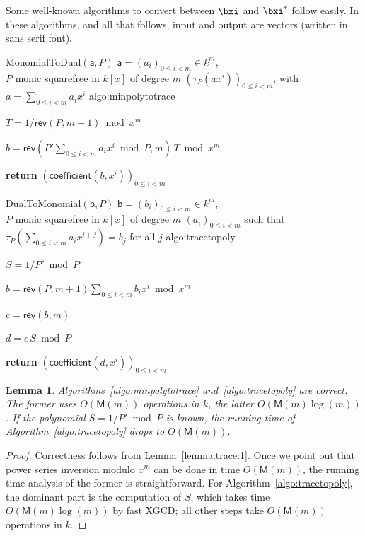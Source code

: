 \documentclass{sig-alternate}
\def\M {\ensuremath{\mathsf{M}}}
\def\va {\ensuremath{\mathsf{a}}}
\def\vb {\ensuremath{\mathsf{b}}}
\def\coeff {\ensuremath{\mathsf{coefficient}}}
\def\rev {\ensuremath{\mathsf{rev}}}
\newcounter{algo}
\newenvironment{algorithm_noendline}[4]{\small\begin{center}\begin{minipage}{0.48\textwidth}
      \refstepcounter{algo}
      \label{#4}
      \sf
      \rule{\textwidth}{0.2pt}\\
      \makebox[\textwidth][c]{Algorithm~\arabic{algo}:~\textbf{#1}}\\
      \rule[0.5\baselineskip]{\textwidth}{0.2pt}\\

      \vspace{-12pt}

      \parbox{\textwidth}{\textbf{Input} #2}
      \parbox{\textwidth}{\textbf{Output} #3}

\vspace{-7pt}

      \begin{enumerate*}}{\end{enumerate*}
      \vspace{-11pt}
\end{minipage}\end{center}
}
\newenvironment{algorithm_endline}[4]{\small\begin{center}\begin{minipage}{0.48\textwidth}
      \refstepcounter{algo}
      \label{#4}
      \sf
      \rule{\textwidth}{0.2pt}\\
      \makebox[\textwidth][c]{Algorithm~\arabic{algo}:~\textbf{#1}}\\
      \rule[0.5\baselineskip]{\textwidth}{0.2pt}\\

      \vspace{-12pt}

      \parbox{\textwidth}{\textbf{Input} #2}
      \parbox{\textwidth}{\textbf{Output} #3}

\vspace{-7pt}

      \begin{enumerate*}}{\end{enumerate*}
      \vspace{-11pt}
      \rule{\textwidth}{0.2pt}
\end{minipage}\end{center}
}
\newtheorem{Lemma}{Lemma}
\begin{document}
Some well-known algorithms to convert between $\bxi$ and $\bxi^\ast$
follow easily. In these algorithms, and all that follows, input and
output are vectors (written in {\sf sans serif} font).

\begin{algorithm_noendline}
{MonomialToDual$(\va,P)$}
{$\va=(a_i)_{0 \le i < m} \in k^m$, \\  $P$ monic squarefree in $k[x]$ of degree $m$}
{$(\tau_P(a x^i))_{0 \le i < m}$, with $a=\sum_{0 \le i < m} a_i x^i$}
{algo:minpolytotrace}
\item $T = 1/\rev(P, m+1) \bmod x^m$
\item $b = \rev(P' \sum_{0 \le i < m} a_i x^i \bmod P, m)\, T \bmod x^m$
\item {\bf return} $(\coeff(b,x^i))_{0 \le i < m}$
\end{algorithm_noendline}

\begin{algorithm_endline}
{DualToMonomial$(\vb, P)$}
{$\vb=(b_i)_{0 \le i < m} \in k^m$,\\ $P$ monic squarefree in $k[x]$ of degree $m$}
{$(a_i)_{0 \le i < m}$ such that $\tau_P(\sum_{0 \le i < m} a_i x^{i+j}) = b_j$ for all $j$}
{algo:tracetopoly}
\item $S = 1/P' \bmod P$
\item $b= \rev(P,m+1) \sum_{0 \le i < m} b_i x^i \bmod x^m$
\item $c= \rev(b, m)$
\item $d =c\, S \bmod P$
\item {\bf return} $(\coeff(d,x^i))_{0 \le i < m}$
\end{algorithm_endline}

\begin{Lemma}\label{lemma:uniconv}
  Algorithms~\ref{algo:minpolytotrace} and~\ref{algo:tracetopoly} are
  correct. The former uses $O(\M(m))$ operations in $k$, the
  latter $O(\M(m)\log(m))$.  If the polynomial $S=1/P' \bmod P$ is
  known, the running time of Algorithm~\ref{algo:tracetopoly} drops to
  $O(\M(m))$.
\end{Lemma}
\begin{proof}
  Correctness follows from Lemma~\ref{lemma:trace:1}.  Once we point
  out that power series inversion modulo $x^m$ can be done in time
  $O(\M(m))$, the running time analysis of the former is
  straightforward. For Algorithm~\ref{algo:tracetopoly}, the dominant
  part is the computation of $S$, which takes time $O(\M(m)\log(m))$
  by fast XGCD; all other steps take $O(\M(m))$ operations in $k$.
\end{proof}
\end{document}
